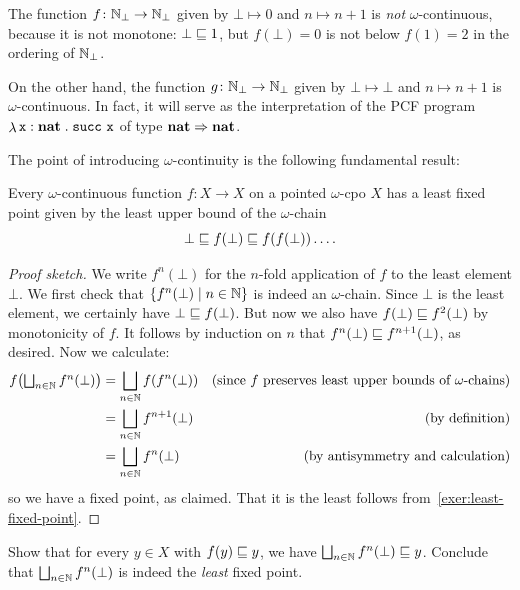 \begin{example}
  The function \(f \colon \mathbb N_\bot \to \mathbb N_\bot\) given by \(\bot \mapsto 0\)
  and \(n \mapsto n + 1\) is \emph{not} \(\omega\)-continuous, because it is not
  monotone: \(\bot \sqsubseteq 1\), but \(f(\bot) = 0\) is not below \(f(1) = 2\) in
  the ordering of \(\mathbb N_\bot\).

  On the other hand, the function \(g \colon \mathbb N_\bot \to \mathbb N_\bot\) given by
  \(\bot \mapsto \bot\) and \(n \mapsto n+1\) is \(\omega\)-continuous.
  In fact, it will serve as the interpretation of the PCF program
  \(\mathop{\lambda}{\mathtt x : \mathtt{\mathbf{nat}}}\mathrel{.}\operatorname{\mathtt{succ}}\,\mathtt x\) of type
  \(\mathtt{\mathbf{nat}} \Rightarrow \mathtt{\mathbf{nat}}\).
\end{example}

The point of introducing \(\omega\)-continuity is the following fundamental
result:

\begin{theorem}\label{least-fixed-point}
  Every \(\omega\)-continuous function \(f \colon X \to X\) on a pointed
  \(\omega\)-cpo \(X\) has a least fixed point given by the least upper bound of
  the \(\omega\)-chain
  \[
    \bot \sqsubseteq f(\bot) \sqsubseteq f(f(\bot)) \dots.
  \]
\end{theorem}
\begin{proof}[Proof sketch]
  We write \(f^n(\bot)\) for the \(n\)-fold application of \(f\) to the least
  element \(\bot\).
  We first check that \(\{f^n(\bot) \mid n \in \mathbb N\}\) is indeed an
  \(\omega\)-chain.
  Since \(\bot\) is the least element, we certainly have
  \(\bot \sqsubseteq f(\bot)\). But now we also have \(f(\bot) \sqsubseteq f^2(\bot)\) by
  monotonicity of \(f\). It follows by induction on \(n\) that
  \(f^n(\bot) \sqsubseteq f^{n+1}(\bot)\), as desired.
  Now we calculate:
  \begin{align*}
    f\pa*{\textstyle\bigsqcup_{n \in \Nat}f^n(\bot)}
    &= \bigsqcup_{n \in \Nat}f\pa*{f^n(\bot)}
    &\text{(since \(f\) preserves least upper bounds of \(\omega\)-chains)} \\
    &= \bigsqcup_{n \in \Nat}f^{n+1}(\bot)
    &\text{(by definition)} \\
    &= \bigsqcup_{n \in \Nat}f^{n}(\bot)
    &\text{(by antisymmetry and calculation)}
  \end{align*}
  so we have a fixed point, as claimed. That it is the least follows
  from~\cref{exer:least-fixed-point}.
\end{proof}

\begin{exercise}\label{exer:least-fixed-point}
  Show that for every \(y \in X\) with \(f(y) \sqsubseteq y\), we have
  \(\bigsqcup_{n \in \mathbb N}f^n(\bot) \sqsubseteq y\).
  Conclude that \(\bigsqcup_{n \in \mathbb N}f^n(\bot)\) is indeed the \emph{least} fixed point.
\end{exercise}

